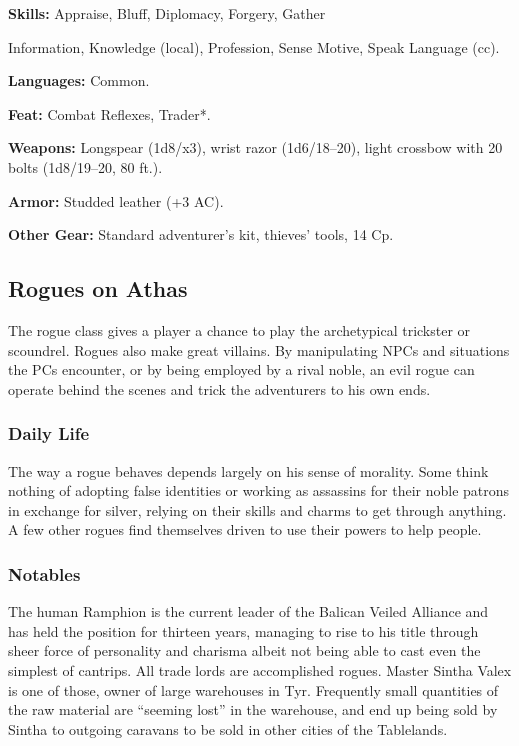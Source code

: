 \textbf{Skills:} Appraise, Bluff, Diplomacy, Forgery, Gather

Information, Knowledge (local), Profession, Sense Motive, Speak Language (cc).

\textbf{Languages:} Common.

\textbf{Feat:} Combat Reflexes, Trader*.

\textbf{Weapons:} Longspear (1d8/x3), wrist razor (1d6/18–20), light crossbow with 20 bolts (1d8/19–20, 80 ft.).

\textbf{Armor:} Studded leather (+3 AC).

\textbf{Other Gear:} Standard adventurer’s kit, thieves’ tools, 14 Cp.

\subsection{Rogues on Athas}

The rogue class gives a player a chance to play the archetypical trickster or scoundrel. Rogues also make great villains. By manipulating NPCs and situations the PCs encounter, or by being employed by a rival noble, an evil rogue can operate behind the scenes and trick the adventurers to his own ends.

\subsubsection{Daily Life}
The way a rogue behaves depends largely on his sense of morality. Some think nothing of adopting false identities or working as assassins for their noble patrons in exchange for silver, relying on their skills and charms to get through anything. A few other rogues find themselves driven to use their powers to help people.

\subsubsection{Notables}
The human Ramphion is the current leader of the Balican Veiled Alliance and has held the position for thirteen years, managing to rise to his title through sheer force of personality and charisma albeit not being able to cast even the simplest of cantrips. All trade lords are accomplished rogues. Master Sintha Valex is one of those, owner of large warehouses in Tyr. Frequently small quantities of the raw material are “seeming lost” in the warehouse, and end up being sold by Sintha to outgoing caravans to be sold in other cities of the Tablelands.

